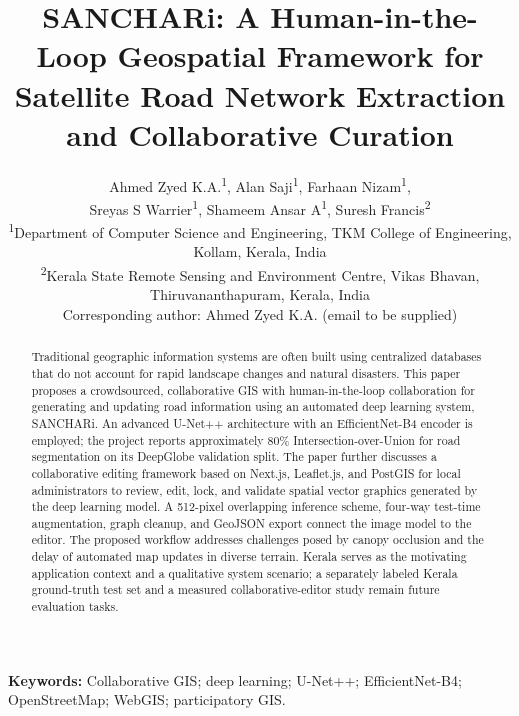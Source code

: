\documentclass[10pt,a4paper,twocolumn]{article}
\begin{document}
\title{\bfseries\fontsize{14}{16}\selectfont SANCHARi: A Human-in-the-Loop Geospatial Framework for Satellite Road Network Extraction and Collaborative Curation}
\author{\small Ahmed Zyed K.A.\textsuperscript{1}, Alan Saji\textsuperscript{1}, Farhaan Nizam\textsuperscript{1},\\
\small Sreyas S Warrier\textsuperscript{1}, Shameem Ansar A\textsuperscript{1}, Suresh Francis\textsuperscript{2}\\[0.35em]
\footnotesize \textsuperscript{1}Department of Computer Science and Engineering, TKM College of Engineering, Kollam, Kerala, India\\
\footnotesize \textsuperscript{2}Kerala State Remote Sensing and Environment Centre, Vikas Bhavan, Thiruvananthapuram, Kerala, India\\
\footnotesize Corresponding author: Ahmed Zyed K.A. (email to be supplied)}
\date{}

\maketitle

\begin{abstract}
Traditional geographic information systems are often built using centralized databases that do not account for rapid landscape changes and natural disasters. This paper proposes a crowdsourced, collaborative GIS with human-in-the-loop collaboration for generating and updating road information using an automated deep learning system, SANCHARi. An advanced U-Net++ architecture with an EfficientNet-B4 encoder is employed; the project reports approximately 80\% Intersection-over-Union for road segmentation on its DeepGlobe validation split. The paper further discusses a collaborative editing framework based on Next.js, Leaflet.js, and PostGIS for local administrators to review, edit, lock, and validate spatial vector graphics generated by the deep learning model. A 512-pixel overlapping inference scheme, four-way test-time augmentation, graph cleanup, and GeoJSON export connect the image model to the editor. The proposed workflow addresses challenges posed by canopy occlusion and the delay of automated map updates in diverse terrain. Kerala serves as the motivating application context and a qualitative system scenario; a separately labeled Kerala ground-truth test set and a measured collaborative-editor study remain future evaluation tasks.
\end{abstract}
\noindent\textbf{Keywords:} Collaborative GIS; deep learning; U-Net++; EfficientNet-B4; OpenStreetMap; WebGIS; participatory GIS.
\end{document}
